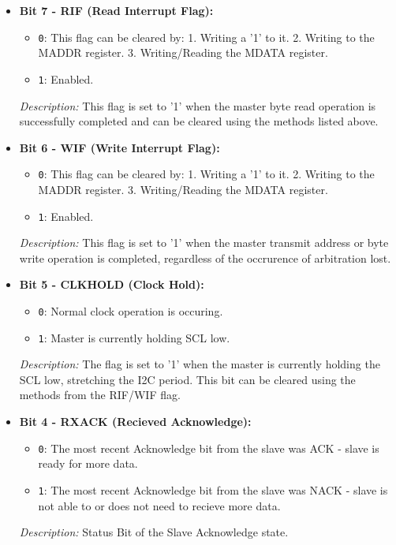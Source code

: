   
  \begin{itemize}
      \item \textbf{Bit 7 - RIF (Read Interrupt Flag):} 
      \begin{itemize}
          \item \texttt{0}: This flag can be cleared by: 1. Writing a '1' to it. 2. Writing to the MADDR register. 3. Writing/Reading the MDATA register.
          \item \texttt{1}: Enabled.
      \end{itemize}
      \textit{Description:} This flag is set to '1' when the master byte read operation is successfully completed and can be cleared using the methods listed above.
      
      \item \textbf{Bit 6 - WIF (Write Interrupt Flag):} 
      \begin{itemize}
          \item \texttt{0}: This flag can be cleared by: 1. Writing a '1' to it. 2. Writing to the MADDR register. 3. Writing/Reading the MDATA register.
          \item \texttt{1}: Enabled.
      \end{itemize}
      \textit{Description:} This flag is set to '1' when the master transmit address or byte write operation is completed, regardless of the occrurence of arbitration lost.
      
      \item \textbf{Bit 5 - CLKHOLD (Clock Hold):} 
      \begin{itemize}
          \item \texttt{0}: Normal clock operation is occuring.
          \item \texttt{1}: Master is currently holding SCL low.
      \end{itemize}
      \textit{Description:} The flag is set to '1' when the master is currently holding the SCL low, stretching the I2C period. This bit can be cleared using the methods from the RIF/WIF flag.

      \item \textbf{Bit 4 - RXACK (Recieved Acknowledge):} 
      \begin{itemize}
          \item \texttt{0}: The most recent Acknowledge bit from the slave was ACK - slave is ready for more data.
          \item \texttt{1}: The most recent Acknowledge bit from the slave was NACK - slave is not able to or does not need to recieve more data.
      \end{itemize}
      \textit{Description:} Status Bit of the Slave Acknowledge state.


\end{itemize}
